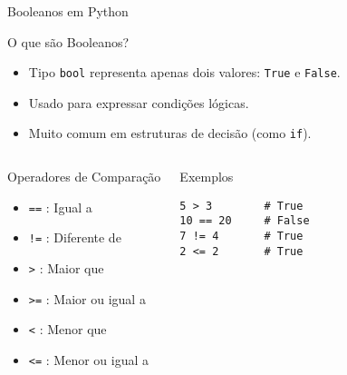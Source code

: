\begin{frame}[fragile]{Booleanos em Python}

\begin{block}{O que são Booleanos?}
\begin{itemize}
    \item Tipo \texttt{bool} representa apenas dois valores: \texttt{True} e \texttt{False}.
    \item Usado para expressar condições lógicas.
    \item Muito comum em estruturas de decisão (como \texttt{if}).
\end{itemize}
\end{block}

\vspace{0.5em}

\begin{columns}[T]
    \begin{block}{Operadores de Comparação}
    \begin{itemize}
        \item \texttt{==} : Igual a
        \item \texttt{!=} : Diferente de
        \item \texttt{>}  : Maior que
        \item \texttt{>=} : Maior ou igual a
        \item \texttt{<}  : Menor que
        \item \texttt{<=} : Menor ou igual a
    \end{itemize}
    \end{block}

    \begin{block}{Exemplos}
\begin{verbatim}
5 > 3        # True
10 == 20     # False
7 != 4       # True
2 <= 2       # True
\end{verbatim}
    \end{block}
\end{columns}

\end{frame}


